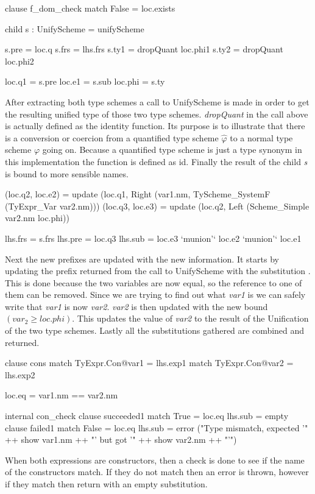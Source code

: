 \begin{code}
   clause f_dom_check
     match False = loc.exists
     
     child s : UnifyScheme = unifyScheme
     
     s.pre = loc.q
     s.frs = lhs.frs
     s.ty1 = dropQuant loc.phi1
     s.ty2 = dropQuant loc.phi2
     
     loc.q1  = s.pre
     loc.e1  = s.sub
     loc.phi = s.ty
\end{code}
After extracting both type schemes a call to UnifyScheme is made in order to get the resulting unified type of those two type schemes. \emph{dropQuant} in the call above is actually defined as the identity function. Its purpose is to illustrate that there is a conversion or coercion from a quantified type scheme $\hat{\varphi}$ to a normal type scheme $\varphi$ going on. Because a quantified type scheme is just a type synonym in this implementation the function is defined as id. Finally the result of the child \emph{s} is bound to more sensible names.

\begin{code}                            
   (loc.q2, loc.e2) = update (loc.q1, Right (var1.nm, TyScheme_SystemF (TyExpr_Var var2.nm)))
   (loc.q3, loc.e3) = update (loc.q2, Left (Scheme_Simple var2.nm loc.phi)) 
   
   lhs.frs = s.frs
   lhs.pre = loc.q3
   lhs.sub = loc.e3 `munion'` loc.e2 `munion'` loc.e1
\end{code}
Next the new prefixes are updated with the new information. It starts by updating the prefix returned from the call to UnifyScheme with the substitution . This is done because the two variables are now equal, so the reference to one of them can be removed. Since we are trying to find out what \emph{var1} is we can safely write that \emph{var1} is now \emph{var2}. \emph{var2} is then updated with the new bound $(var_2 \geq loc.phi)$. This updates the value of \emph{var2} to the result of the Unification of the two type schemes. Lastly all the substitutions gathered are combined and returned.

\begin{code}
   clause cons
     match TyExpr.Con@var1 = lhs.exp1
     match TyExpr.Con@var2 = lhs.exp2
     
     loc.eq = var1.nm == var2.nm
     
     internal con_check
        clause succeeded1
          match True  = loc.eq
          lhs.sub     = empty
        clause failed1
          match False = loc.eq
          lhs.sub = error ("Type mismatch, expected '" ++ show var1.nm ++ "' but got '" ++ show var2.nm ++ "'")
\end{code}
When both expressions are constructors, then a check is done to see if the name of the constructors match. If they do not match then an error is thrown, however if they match then return with an empty substitution.

